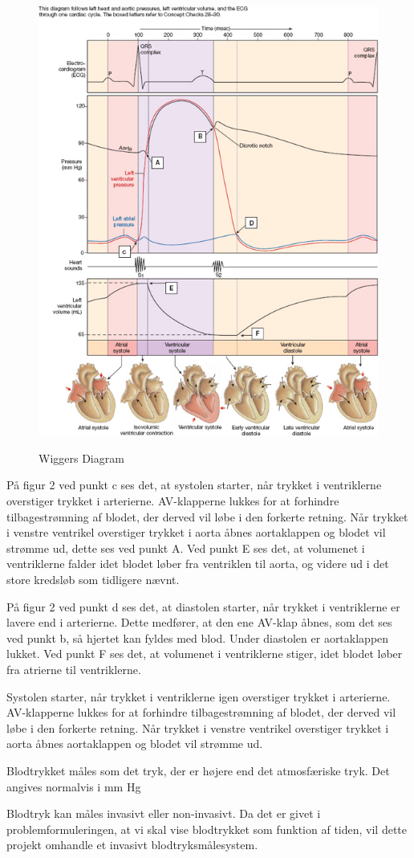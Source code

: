 \begin{figure}[h!]
	\centering
	\includegraphics[width=0.7\linewidth]{Teori/Fysiologi/Blodtryk}
	\label{fig:blodtryk}
	\caption{Wiggers Diagram \cite{WiggersDiagram}}
\end{figure}

På figur 2 ved punkt c ses det, at systolen starter, når trykket i ventriklerne overstiger trykket i arterierne. AV-klapperne lukkes for at forhindre tilbagestrømning af blodet, der derved vil løbe i den forkerte retning. Når trykket i venstre ventrikel overstiger trykket i aorta åbnes aortaklappen og blodet vil strømme ud, dette ses ved punkt A. Ved punkt E ses det, at volumenet i ventriklerne falder idet blodet løber fra ventriklen til aorta, og videre ud i det store kredsløb som tidligere nævnt. 

På figur 2 ved punkt d ses det, at diastolen starter, når trykket i ventriklerne er lavere end i arterierne. Dette medfører, at den ene AV-klap åbnes, som det ses ved punkt b, så hjertet kan fyldes med blod. Under diastolen er aortaklappen lukket. Ved punkt F ses det, at volumenet i ventriklerne stiger, idet blodet løber fra atrierne til ventriklerne. 

Systolen starter, når trykket i ventriklerne igen overstiger trykket i arterierne. AV-klapperne
lukkes for at forhindre tilbagestrømning af blodet, der derved vil løbe i den forkerte retning. Når
trykket i venstre ventrikel overstiger trykket i aorta åbnes aortaklappen og blodet vil strømme
ud.

Blodtrykket måles som det tryk, der er højere end det atmosfæriske tryk. Det angives normalvis i mm Hg

Blodtryk kan måles invasivt eller non-invasivt. Da det er givet i problemformuleringen, at vi skal vise blodtrykket som funktion af tiden, vil dette projekt omhandle et invasivt blodtryksmålesystem. 
